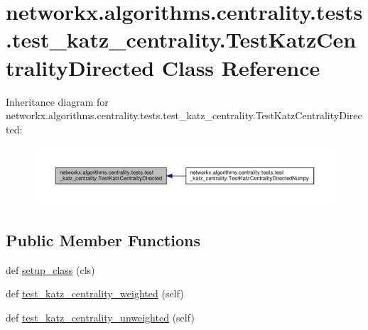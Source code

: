 \hypertarget{classnetworkx_1_1algorithms_1_1centrality_1_1tests_1_1test__katz__centrality_1_1TestKatzCentralityDirected}{}\section{networkx.\+algorithms.\+centrality.\+tests.\+test\+\_\+katz\+\_\+centrality.\+Test\+Katz\+Centrality\+Directed Class Reference}
\label{classnetworkx_1_1algorithms_1_1centrality_1_1tests_1_1test__katz__centrality_1_1TestKatzCentralityDirected}


Inheritance diagram for networkx.\+algorithms.\+centrality.\+tests.\+test\+\_\+katz\+\_\+centrality.\+Test\+Katz\+Centrality\+Directed\+:
\nopagebreak
\begin{figure}[H]
\begin{center}
\leavevmode
\includegraphics[width=350pt]{classnetworkx_1_1algorithms_1_1centrality_1_1tests_1_1test__katz__centrality_1_1TestKatzCentralityDirected__inherit__graph}
\end{center}
\end{figure}
\subsection*{Public Member Functions}
\begin{DoxyCompactItemize}
\item 
def \hyperlink{classnetworkx_1_1algorithms_1_1centrality_1_1tests_1_1test__katz__centrality_1_1TestKatzCentralityDirected_aa6b1a9faa660083df3d93bacea0b8f8c}{setup\+\_\+class} (cls)
\item 
def \hyperlink{classnetworkx_1_1algorithms_1_1centrality_1_1tests_1_1test__katz__centrality_1_1TestKatzCentralityDirected_ac593b6fb3df36b2e6555c4cf000a313a}{test\+\_\+katz\+\_\+centrality\+\_\+weighted} (self)
\item 
def \hyperlink{classnetworkx_1_1algorithms_1_1centrality_1_1tests_1_1test__katz__centrality_1_1TestKatzCentralityDirected_ac48cf276a6930a7caa1fff7c8490d2a6}{test\+\_\+katz\+\_\+centrality\+\_\+unweighted} (self)
\end{DoxyCompactItemize}
